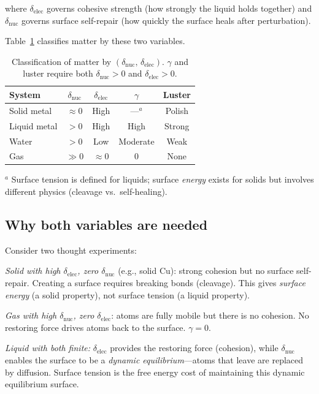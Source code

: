\documentclass[twocolumn,showpacs,preprintnumbers,amsmath,amssymb,prb]{revtex4-2}
\begin{document}
where $\delta_\mathrm{elec}$ governs cohesive strength
(how strongly the liquid holds together) and
$\delta_\mathrm{nuc}$ governs surface self-repair
(how quickly the surface heals after perturbation).

Table~\ref{tab:two_var} classifies matter by these
two variables.

\begin{table}[htb]
  \centering
  \caption{Classification of matter by
    $(\delta_\mathrm{nuc},\,\delta_\mathrm{elec})$.
    $\gamma$ and luster require both
    $\delta_\mathrm{nuc} > 0$ and
    $\delta_\mathrm{elec} > 0$.}
  \label{tab:two_var}
  \begin{ruledtabular}
  \begin{tabular}{lcccc}
    System & $\delta_\mathrm{nuc}$ & $\delta_\mathrm{elec}$ &
      $\gamma$ & Luster \\
    \hline
    Solid metal & $\approx 0$ & High & ---$^a$ & Polish \\
    Liquid metal & $> 0$ & High & High & Strong \\
    Water & $> 0$ & Low & Moderate & Weak \\
    Gas & $\gg 0$ & $\approx 0$ & $0$ & None \\
  \end{tabular}
  \end{ruledtabular}
  {\footnotesize $^a$ Surface tension is defined for liquids;
  surface \emph{energy} exists for solids but involves
  different physics (cleavage vs.\ self-healing).}
\end{table}

\subsection{Why both variables are needed}

Consider two thought experiments:

\emph{Solid with high $\delta_\mathrm{elec}$, zero $\delta_\mathrm{nuc}$}
(e.g., solid Cu):
strong cohesion but no surface self-repair.
Creating a surface requires breaking bonds (cleavage).
This gives \emph{surface energy} (a solid property),
not surface tension (a liquid property).

\emph{Gas with high $\delta_\mathrm{nuc}$, zero $\delta_\mathrm{elec}$}:
atoms are fully mobile but there is no cohesion.
No restoring force drives atoms back to the surface.
$\gamma = 0$.

\emph{Liquid with both finite:}
$\delta_\mathrm{elec}$ provides the restoring force
(cohesion), while $\delta_\mathrm{nuc}$ enables
the surface to be a \emph{dynamic equilibrium}---atoms
that leave are replaced by diffusion.
Surface tension is the free energy cost of maintaining
this dynamic equilibrium surface.
\end{document}
